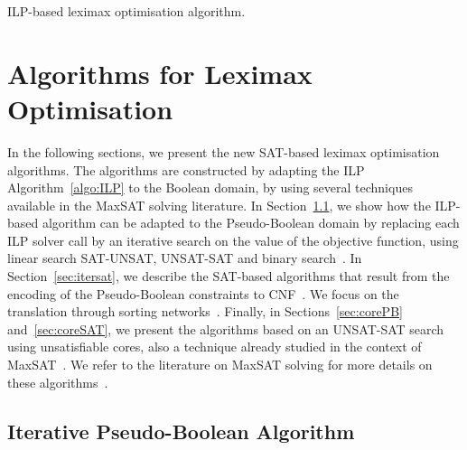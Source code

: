 \documentclass[a4paper,UKenglish,cleveref, autoref, thm-restate]{lipics-v2021}
\begin{document}
\begin{algorithm}[t]
\DontPrintSemicolon {}
\Return{$\alpha$}\;
\caption{ILP-based leximax optimisation algorithm.}
\label{algo:ILP}
\end{algorithm} 

\section{Algorithms for Leximax Optimisation}
\label{sec:algorithms}

In the following sections, we present the new SAT-based leximax optimisation algorithms.
The algorithms are constructed by adapting the ILP Algorithm~\ref{algo:ILP} to the Boolean domain, by using several techniques available in the MaxSAT solving literature.
In Section~\ref{sec:iterpb}, we show how the ILP-based algorithm can be adapted to the Pseudo-Boolean domain by replacing each ILP solver call by an iterative search on the value of the objective function, using linear search SAT-UNSAT, UNSAT-SAT and binary search~\cite{sat4j,qmaxsat,aloul2002pbs,FuMalik2006}.
In Section~\ref{sec:itersat}, we describe the SAT-based algorithms that result from the encoding of the Pseudo-Boolean constraints to CNF~\cite{DBLP:journals/jsat/EenS06,gen-totalizer,swc,pol-watchdog,enc-linear-to-sat}. We focus on the translation through sorting networks~\cite{DBLP:journals/jsat/EenS06}.
Finally, in Sections~\ref{sec:corePB} and~\ref{sec:coreSAT}, we present the algorithms based on an UNSAT-SAT search using unsatisfiable cores, also a technique already studied in the context of MaxSAT~\cite{marques-silva2007,AnsoteguiBL09,DBLP:conf/sat/DaviesB13}. We refer to the literature on MaxSAT solving for more details on these algorithms~\cite{DBLP:journals/constraints/MorgadoHLPM13,maxsat-chapter-handbook21}.

\subsection{Iterative Pseudo-Boolean Algorithm}
\label{sec:iterpb}
\end{document}
